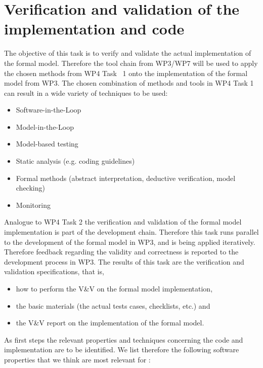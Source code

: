 \section{Verification and validation of the implementation and code}

The objective of this task is to verify and validate the actual implementation of the formal model.
Therefore the tool chain from WP3\slash WP7 will be used to apply the chosen methods from
WP4 Task~ 1 onto the implementation of the formal model from WP3.
The chosen combination of methods and tools in WP4 Task 1 can result
in a wide variety of techniques to be used:

\begin{itemize}
\item Software-in-the-Loop
\item  Model-in-the-Loop
\item  Model-based testing
\item  Static analysis (e.g. coding guidelines)
\item  Formal methods (abstract interpretation, deductive verification, model checking)
\item  Monitoring
\end{itemize}

Analogue to WP4 Task 2 the verification and validation of the formal model
implementation is part of the development chain.
Therefore this task runs parallel to the development of the formal model in WP3, and is being applied iteratively.
Therefore feedback regarding the validity and correctness is reported to the
development process in WP3.
The results of this task are the verification and validation specifications, that is,

\begin{itemize}
\item 
how to perform the V\&V on the formal model implementation,

\item
the basic materials (the actual tests cases, checklists, etc.) and

\item
the V\&V report on the implementation of the formal model.
\end{itemize}

As first steps the relevant properties and techniques concerning the code and
implementation are to be identified. 
We list therefore the following software properties that we think are most relevant for \vv:

